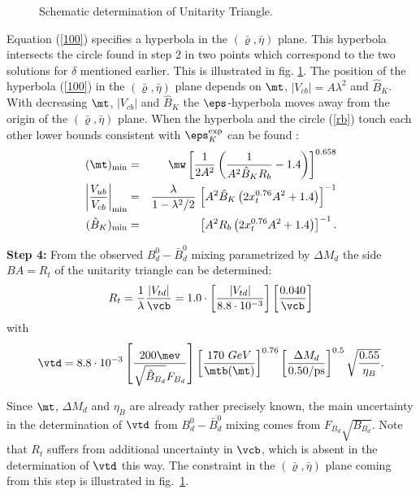 \begin{figure}[hbt]
\vspace{0.010in}
\centerline{
\epsfysize=4in
}
\vspace{0.0108in}
\caption[]{Schematic determination of Unitarity Triangle.
\label{L:10}}
\end{figure}
Equation (\ref{100}) specifies 
a hyperbola in the $(\bar \varrho, \bar\eta)$
plane.
This hyperbola intersects the circle found in step 2
in two points which correspond to the two solutions for
$\delta$ mentioned earlier. This is illustrated in fig. \ref{L:10}.
The position of the hyperbola (\ref{100}) in the
$(\bar\varrho,\bar\eta)$ plane depends on $\mt$, $|V_{cb}|=A \lambda^2$
and $\hat B_K$. With decreasing $\mt$, $|V_{cb}|$ and $\hat B_K$ the
$\eps$-hyperbola moves away from the origin of the
$(\bar\varrho,\bar\eta)$ plane. When the hyperbola and the circle
(\ref{rb}) touch each other lower bounds consistent with $\eps_K^{\rm
exp}$  can be found \cite{Buras}:
\begin{eqnarray}
(\mt)_{\rm min} &=& \mw \left[ \frac{1}{2 A^2} \left( \frac{1}
{A^2 \hat B_K R_b} - 1.4 \right) \right]^{0.658}
\label{eq:mtmin} \\
\left| \frac{V_{ub}}{V_{cb}} \right|_{\rm min} &=&
\frac{\lambda}{1-\lambda^2/2} \,
\left[ A^2 \hat B_K \left( 2 x_t^{0.76} A^2 + 1.4 \right) \right]^{-1}
\label{eq:Vubcbmin} \\
(\hat B_K)_{\rm min} &=& 
\left[ A^2 R_b \left( 2 x_t^{0.76} A^2 + 1.4 \right)
                    \right]^{-1}.
\label{eq:BKmin}
\end{eqnarray}

{\bf Step 4:}
{}From the observed $B^0_d-\bar B^0_d$ mixing parametrized by $\Delta M_d$ 
the side $BA=R_t$ of the unitarity triangle can be determined:
\begin{equation}\label{106}
 R_t= \frac{1}{\lambda}\frac{|V_{td}|}{\vcb} = 1.0 \cdot
\left[\frac{|V_{td}|}{8.8\cdot 10^{-3}} \right] 
\left[ \frac{0.040}{\vcb} \right]
\end{equation}
with
\begin{equation}\label{VT}
\vtd=
8.8\cdot 10^{-3}\left[ 
\frac{200\mev}{\sqrt{\hat B_{B_d}}F_{B_d}}\right]
\left[\frac{170~GeV}{\mtb(\mt)} \right]^{0.76} 
\left[\frac{\Delta M_d}{0.50/{\rm ps}} \right ]^{0.5} 
\sqrt{\frac{0.55}{\eta_B}}.
\end{equation}

Since $\mt$, $\Delta M_d$ and $\eta_B$ are already rather precisely
known, the main uncertainty in the determination of $\vtd$ from
$B_d^0-\bar B_d^0$ mixing comes from $F_{B_d}\sqrt{B_{B_d}}$.
Note that $R_t$ suffers from additional uncertainty in $\vcb$,
which is absent in the determination of $\vtd$ this way. 
The constraint in the $(\bar\varrho,\bar\eta)$ plane coming from
this step is illustrated in fig.~\ref{L:10}.

